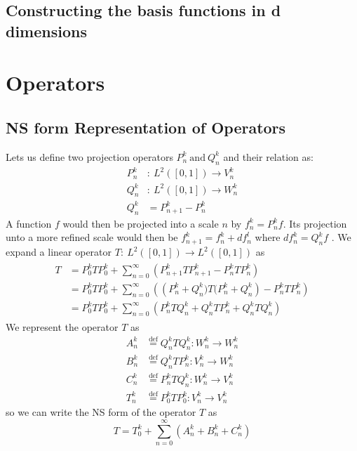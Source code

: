 \documentclass[../master_thesis.tex]{subfiles}
\begin{document}
\subsection{Constructing the basis functions in d dimensions}
\section{Operators}
\subsection{\ac{NS} form Representation of Operators}
Lets us define two projection operators $P^k_n \ \text{and}\ Q^k_n $  and their relation as:
\begin{align}
  P^k_n &: \ L^2([0, 1]) \to V^k_n \\
  Q^k_n &:\  L^2([0, 1]) \to W^k_n \\
  Q^k_n &= P^k_{n+1} - P^k_n
\end{align}
A function $f$ would then be projected into a scale $n$ by $ f^k_n = P^k_n f $.
Its projection unto a more refined scale would then be $ f_{n+1}^k = f^k_n + df^l_n$
where $df^k_n = Q^k_nf$ \cite{Frediani:2013}.
We expand a linear operator $T:\ L^2([0, 1]) \to L^2([0, 1])$ as
\begin{align}
  \begin{split}
    T &= P^k_0TP^k_0 + \sum^\infty_{n=0}\left( P^k_{n+1}TP^k_{n+1} - P^k_nTP^k_n\right)\\
      &=  P^k_0TP^k_0 + \sum^\infty_{n=0}\left(\left(P^k_{n}+Q^k_{n})T(P^k_{n}+Q^k_{n}\right) - P^k_nTP^k_n\right)\\
      &= P^k_0TP^k_0 + \sum^\infty_{n=0}\left(P^k_nTQ^k_n + Q^k_nTP^k_n + Q^k_nTQ^k_n\right)
  \end{split}
\end{align}
We represent the operator $T$ as
\begin{align}
  A^k_n & \stackrel{\text{def}}{=}Q^k_nTQ^k_n: W_n^k \to W_n^k\\
  B^k_n & \stackrel{\text{def}}{=}Q^k_nTP^k_n: V_n^k \to W_n^k\\
  C^k_n & \stackrel{\text{def}}{=}P^k_nTQ^k_n: W_n^k \to V_n^k\\
  T^k_n & \stackrel{\text{def}}{=}P^k_0TP^k_0: V_n^k \to V_n^k
\end{align}
so we can write the \ac{NS} form of the operator $T$ as \cite{Frediani:2013, Beylkin1999AdaptiveSO}
\begin{equation}
  T = T^k_0 + \sum^\infty_{n=0}\left( A^k_n + B^k_n + C^k_n\right)
\end{equation}
\end{document}
